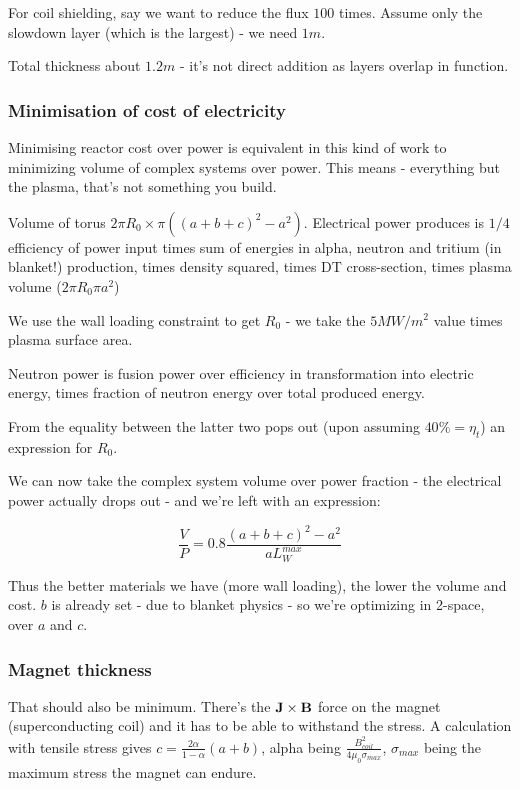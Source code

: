 \documentclass[PlasmaNotes.tex]{subfiles}
\begin{document}
For coil shielding, say we want to reduce the flux $100$ times. Assume only the slowdown layer (which is the largest) - we need $1m$.

Total thickness about $1.2m$ - it's not direct addition as layers overlap in function.

\subsubsection{Minimisation of cost of electricity}

Minimising reactor cost over power is equivalent in this kind of work to minimizing volume of complex systems over power. This means - everything but the plasma, that's not something you build.

Volume of torus $2 \pi R_0 \times \pi ((a+b+c)^2-a^2)$. Electrical power produces is $1/4$ efficiency of power input times sum of energies in alpha, neutron and tritium (in blanket!) production, times density squared, times DT cross-section, times plasma volume ($2\pi R_0 \pi a^2$)

We use the wall loading constraint to get $R_0$ - we take the $5 MW/m^2$ value times plasma surface area.

Neutron power is fusion power over efficiency in transformation into electric energy, times fraction of neutron energy over total produced energy.

From the equality between the latter two pops out (upon assuming $40\% = \eta_t$) an expression for $R_0$.

We can now take the complex system volume over power fraction - the electrical power actually drops out - and we're left with an expression:

\[
 \frac{V}{P} = 0.8 \frac{(a+b+c)^2-a^2}{a L_W^{max}}
\]

Thus the better materials we have (more wall loading), the lower the volume and cost. $b$ is already set - due to blanket physics - so we're optimizing in 2-space, over $a$ and $c$.

\subsubsection{Magnet thickness}

That should also be minimum. There's the $\mathbf{J} \times \mathbf{B}$ force on the magnet (superconducting coil) and it has to be able to withstand the stress. A calculation with tensile stress gives $c=\frac{2\alpha}{1-\alpha}(a+b)$, alpha being $\frac{B_{coil}^2}{4\mu_0 \sigma_{max}}$, $\sigma_{max}$ being the maximum stress the magnet can endure.
\end{document}
